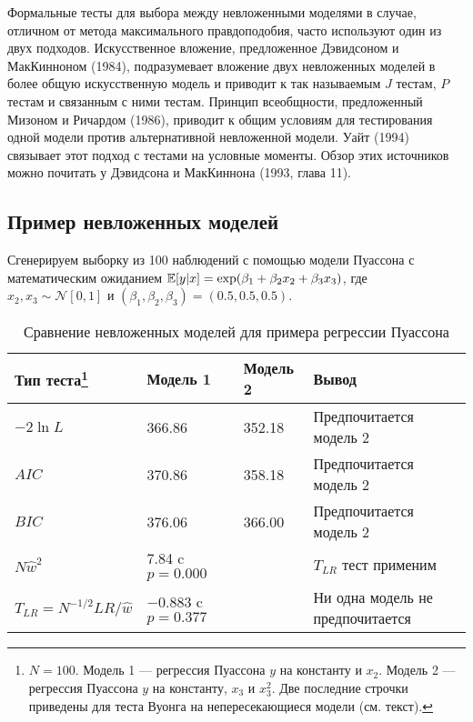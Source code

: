 Формальные тесты для выбора между невложенными моделями в случае, отличном от метода максимального правдоподобия, часто используют один из двух подходов. Искусственное вложение, предложенное Дэвидсоном и МакКинноном (1984), подразумевает вложение двух невложенных моделей в более общую искусственную модель и приводит к так называемым $J$ тестам, $P$ тестам и связанным с ними тестам. Принцип всеобщности, предложенный Мизоном и Ричардом (1986), приводит к общим условиям для тестирования одной модели против альтернативной невложенной модели. Уайт (1994) связывает этот подход с тестами на условные моменты. Обзор этих  источников можно почитать у Дэвидсона и МакКиннона (1993, глава 11).

\subsection{Пример невложенных моделей}

Сгенерируем выборку из 100 наблюдений с помощью модели Пуассона с математическим ожиданием $\mathbb{E}[y|x] = \exp(\beta_1 + \beta_2x_2 + \beta_3x_3)$, где $x_2, x_3 \sim \mathcal{N}[0,1]$ и $(\beta_1, \beta_2, \beta_3) = (0.5, 0.5, 0.5).$

\begin{table}[h]
\begin{center}
\caption{\label{tab:pred} Сравнение невложенных моделей для примера регрессии Пуассона}
\begin{minipage}{17cm}
\begin{tabular}[t]{llll}
\hline
\hline
\bf{Тип теста}\footnote{$N = 100$. Модель 1 --- регрессия Пуассона $y$ на константу и $x_2$. Модель 2 --- регрессия Пуассона $y$ на константу, $x_3$ и $x_3^2$. Две последние строчки приведены для теста Вуонга на непересекающиеся модели (см. текст).} & \bf{Модель 1} & \bf{Модель 2} & \bf{Вывод} \\
\hline
$-2\ln L$ & 366.86 & 352.18 & Предпочитается модель 2 \\
$AIC$ & 370.86 & 358.18 & Предпочитается модель 2 \\
$BIC$ & 376.06 & 366.00 & Предпочитается модель 2 \\
$N\hat{w}^2$ & 7.84 c $p = 0.000$ &  & $T_{LR}$ тест применим \\
$T_{LR} = N^{-1/2}LR/\hat{w}$ & $-0.883$ c $p = 0.377$ &  & Ни одна модель не предпочитается \\
\hline
\hline
\end{tabular}
\end{minipage}
\end{center}
\end{table}

